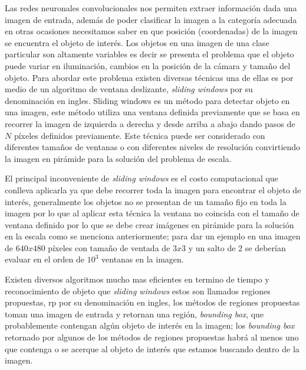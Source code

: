 Las redes neuronales convolucionales nos permiten extraer información dada una imagen de entrada, además de poder clasificar la imagen a la categoría adecuada en otras ocasiones necesitamos saber en que posición (coordenadas) de la imagen se encuentra el objeto de interés. Los objetos en una imagen de una clase particular son altamente variables es decir se presenta el problema que el objeto puede variar en iluminación, cambios en la posición de la cámara y tamaño del objeto. Para abordar este problema existen diversas técnicas una de ellas es por medio de un algoritmo de ventana deslizante, \textit{sliding windows} por su denominación en ingles. Sliding windows es un método para detectar objeto en una imagen, este método utiliza una ventana definida previamente que se basa en recorrer la imagen de izquierda a derecha y desde arriba a abajo dando pasos de $N$ píxeles definidos previamente. Este técnica puede ser considerado con diferentes tamaños de ventanas o con diferentes niveles de resolución convirtiendo la imagen en pirámide para la solución del problema de escala. 

El principal inconveniente de \textit{sliding windows} es el costo computacional que conlleva aplicarla ya que debe recorrer toda la imagen para encontrar el objeto de interés, generalmente los objetos no se presentan de un tamaño fijo en toda la imagen por lo que al aplicar esta técnica la ventana no coincida con el tamaño de ventana definido por lo que se debe crear imágenes en pirámide para la solución en la escala como se menciona anteriormente; para dar un ejemplo en una imagen de $640 x 480$ píxeles con tamaño de ventada de $ 3 x 3$ y un salto de $2$ se deberían evaluar en el orden de $10^3$ ventanas en la imagen.

Existen diversos algoritmos mucho mas eficientes en termino de tiempo y reconocimiento de objeto que \textit{sliding windows} estos son llamados regiones propuestas, \ac{rp} por su denominación en ingles, los métodos de regiones propuestas toman una imagen de entrada y retornan una región, \textit{bounding box},  que probablemente contengan algún objeto de interés en la imagen; los \textit{bounding box} retornado por algunos de los métodos de regiones propuestas habrá al menos uno que contenga o se acerque al objeto de interés que estamos buscando dentro de la imagen.

